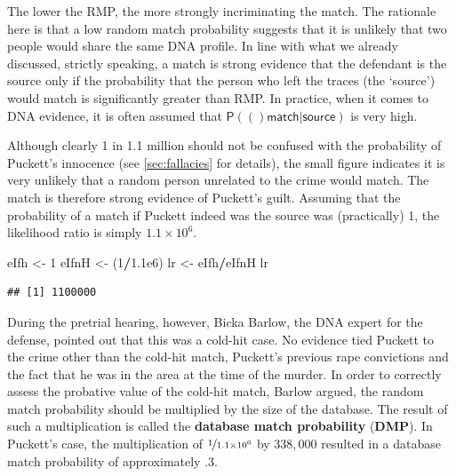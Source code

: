 \documentclass[10pt,dvipsnames,enabledeprecatedfontcommands]{scrartcl}
\newenvironment{Shaded}{\begin{snugshade}}{\end{snugshade}}
\newcommand{\DecValTok}[1]{\textcolor[rgb]{0.00,0.00,0.81}{#1}}
\newcommand{\FloatTok}[1]{\textcolor[rgb]{0.00,0.00,0.81}{#1}}
\newcommand{\StringTok}[1]{\textcolor[rgb]{0.31,0.60,0.02}{#1}}
\newcommand{\OperatorTok}[1]{\textcolor[rgb]{0.81,0.36,0.00}{\textbf{#1}}}
\newcommand{\NormalTok}[1]{#1}
\newcommand{\pr}[1]{\mathsf{P}(#1)}
\begin{document}
The lower the RMP, the more strongly incriminating the match. The
rationale here is that a low random match probability suggests that it
is unlikely that two people would share the same DNA profile. In line
with what we already discussed, strictly speaking, a match is strong
evidence that the defendant is the source only if the probability that
the person who left the traces (the `source') would match is
significantly greater than RMP. In practice, when it comes to DNA
evidence, it is often assumed that
\(\pr(\textsf{match} \vert \textsf{source})\) is very high.

Although clearly 1 in 1.1 million should not be confused with the
probability of Puckett's innocence (see \ref{sec:fallacies} for
details), the small figure indicates it is
very unlikely that a random person unrelated to the crime would match.
The match is therefore strong evidence of Puckett's guilt. Assuming that
the probability of a match if Puckett indeed was the source was
(practically) 1, the likelihood ratio is simply \(1.1 \times 10^6\).


\begin{Shaded}
\begin{Highlighting}[]
\NormalTok{eIfh <-}\StringTok{ }\DecValTok{1}
\NormalTok{eIfnH <-}\StringTok{ }\NormalTok{(}\DecValTok{1}\OperatorTok{/}\FloatTok{1.1e6}\NormalTok{)}
\NormalTok{lr <-}\StringTok{ }\NormalTok{eIfh}\OperatorTok{/}\NormalTok{eIfnH}
\NormalTok{lr}
\end{Highlighting}
\end{Shaded}

\begin{verbatim}
## [1] 1100000
\end{verbatim}

During the pretrial hearing, however, Bicka Barlow, the DNA expert for
the defense, pointed out that this was a cold-hit case. No evidence tied
Puckett to the crime other than the cold-hit match, Puckett's previous
rape convictions and the fact that he was in the area at the time of the
murder. In order to correctly assess the probative value of the cold-hit
match, Barlow argued, the random match probability should be multiplied
by the size of the database. The result of such a multiplication is
called the \textbf{database match probability} (\textbf{DMP}). In
Puckett's case, the multiplication of \(\nicefrac{1}{1.1\times 10^6}\)
by \(338,000\) resulted in a database match probability of approximately
.3.
\end{document}

